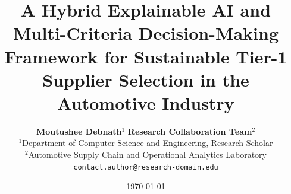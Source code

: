 \documentclass[twocolumn,10pt]{article}
\begin{document}
\title{\textbf{\Large A Hybrid Explainable AI and Multi-Criteria Decision-Making Framework for Sustainable Tier-1 Supplier Selection in the Automotive Industry}}

\author{
    \textbf{Moutushee Debnath}$^{1}$ \quad
    \textbf{Research Collaboration Team}$^{2}$ \\
    \small $^{1}$Department of Computer Science and Engineering, Research Scholar \\
    \small $^{2}$Automotive Supply Chain and Operational Analytics Laboratory \\
    \small \texttt{contact.author@research-domain.edu}
}

\date{\today}

\maketitle
\end{document}
